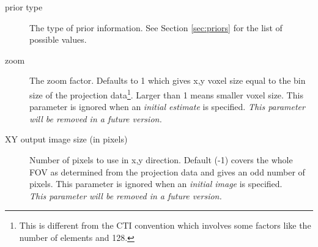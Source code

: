 \documentclass{article}
\begin{document}
\begin{description}
\item[prior type]
The type of prior information. See Section \ref{sec:priors} for the list 
of possible values.

\item[zoom]
The zoom factor. Defaults to 1 which gives x,y voxel size equal 
to the bin size of the projection data\footnote{{\small This is different 
from the CTI convention which involves some factors like the 
number of elements and 128.}}. Larger than 1 means smaller voxel 
size. This parameter is ignored when an \textit{initial estimate} is specified.
\textit{This parameter will be removed in a future version.}

\item[XY output image size (in pixels)]
Number of pixels to use in x,y direction. Default (-1) covers 
the whole FOV as determined from the projection data and gives 
an odd number of pixels. This parameter is ignored when an \textit{initial 
image} is specified. \\
\textit{This parameter will be removed in a future version.}

\end{description}
\end{document}
